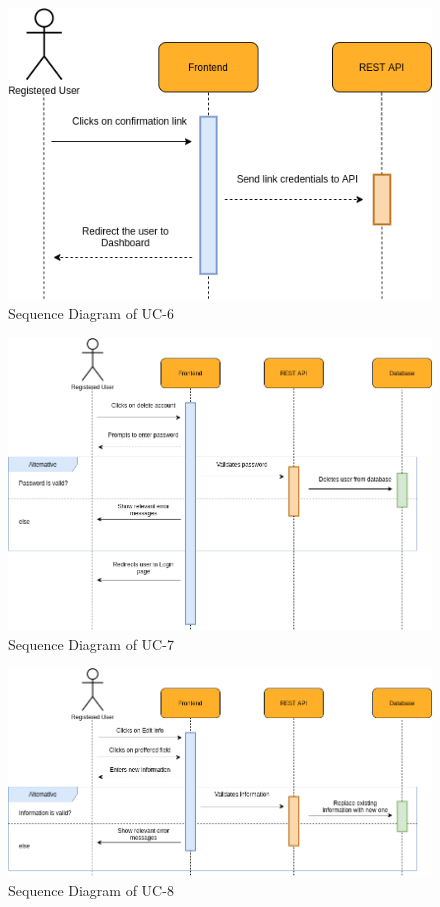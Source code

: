 \begin{figure}[H]
    \centering
    \includegraphics[scale=0.5]{./diagrams/sequence/seq-06.png}
    \caption{Sequence Diagram of UC-6}
    \label{fig:seq-06}
    
\end{figure}


\begin{figure}[H]
    \centering
    \includegraphics[scale=0.5]{./diagrams/sequence/seq-07.png}
    \caption{Sequence Diagram of UC-7}
    \label{fig:seq-07}
    
\end{figure}


\begin{figure}[H]
    \centering
    \includegraphics[scale=0.5]{./diagrams/sequence/seq-08.png}
    \caption{Sequence Diagram of UC-8}
    \label{fig:seq-08}
    
\end{figure}



